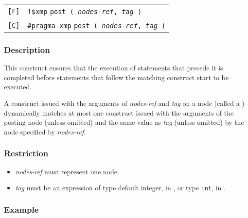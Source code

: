 \begin{tabular}{ll}
\verb![F]! & \verb|!$xmp| {\tt post ( {\it nodes-ref}, {\it tag} )}\\
\verb![C]! & \verb|#pragma xmp| {\tt post ( {\it nodes-ref}, {\it tag} )}\\
\end{tabular}

\subsubsection*{Description}


This construct ensures that the execution of statements that precede
it is completed before statements that follow the matching
 construct start to be executed.

A {\tt {}} construct issued with the arguments of {\it
nodes-ref} and {\it tag} on a node (called a {\it {}})
dynamically matches at most one {\tt {}} construct issued
with the arguments of the posting node (unless omitted) 
and the same value as {\it tag} (unless omitted) by the node specified
by {\it nodes-ref}.

\subsubsection*{Restriction}

\begin{itemize}
 \item {\it nodes-ref} must represent one node.
 \item {\it tag} must be an expression of type default integer, in
       {\XMPF}, or type {\tt int}, in {\XMPC}.
\end{itemize}

\subsubsection*{Example}

